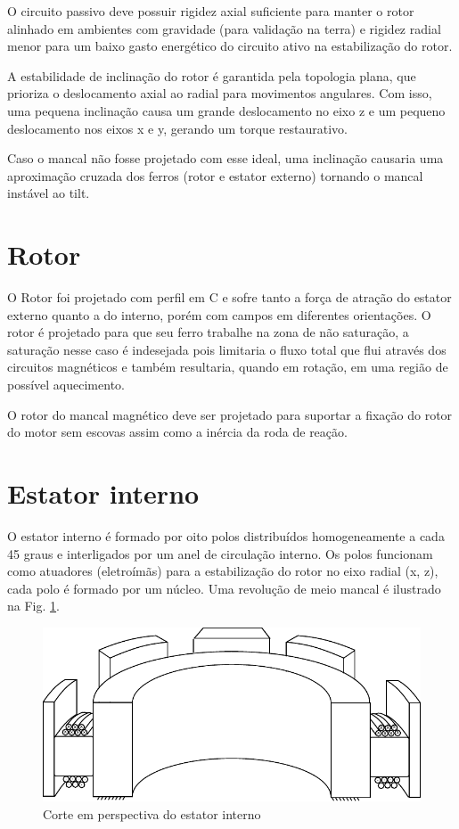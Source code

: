 O circuito passivo deve possuir rigidez axial suficiente para manter o rotor alinhado em ambientes com gravidade (para validação na terra) e rigidez radial menor para um baixo gasto energético do circuito ativo na estabilização do rotor.

A estabilidade de inclinação do rotor é garantida pela topologia plana, que prioriza o deslocamento axial ao radial para movimentos angulares.
Com isso, uma pequena inclinação causa um grande deslocamento no eixo z e um pequeno deslocamento nos eixos x e y, gerando um torque restaurativo. 

Caso o mancal não fosse projetado com esse ideal, uma inclinação causaria uma aproximação cruzada dos ferros (rotor e estator externo) tornando o mancal instável ao tilt. 

\section{Rotor}

O Rotor foi projetado com perfil em C e sofre tanto a força de atração do estator externo quanto a do interno, porém com campos em diferentes orientações. O rotor é projetado para que seu ferro trabalhe na zona de não saturação, a saturação nesse caso é indesejada pois limitaria o fluxo total que flui através dos circuitos magnéticos e também resultaria, quando em rotação, em uma região de possível aquecimento.

O rotor do mancal magnético deve ser projetado para suportar a fixação do rotor do motor sem escovas assim como a inércia da roda de reação. 

\section{Estator interno}

O estator interno é formado por oito polos distribuídos homogeneamente a cada 45 graus e interligados por um anel de circulação interno. Os polos funcionam como atuadores (eletroímãs) para a estabilização do rotor no eixo radial (x, z),  cada polo é formado por um núcleo. Uma revolução de meio mancal é ilustrado na Fig. \ref{fig:modelo:mancal:estator:interno}. 

\begin{figure}[ht!]
	\centering
	\includegraphics[width=1\linewidth]{./Figs/modelo_mancal_estator_interno}
	\caption{Corte em perspectiva do estator interno}
	\label{fig:modelo:mancal:estator:interno}
\end{figure}

